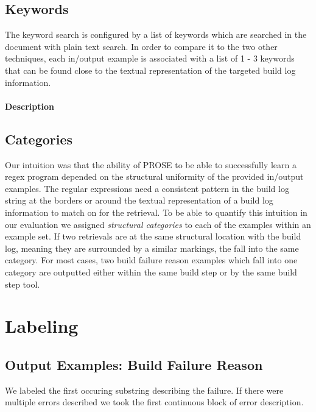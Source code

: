 \documentclass[\myrootdir/main.tex]{subfiles}
\begin{document}
\subsection{Keywords}
The keyword search is configured by a list of keywords which are searched in the document with plain text search. In order to compare it to the two other techniques, each in/output example is associated with a list of 1 - 3 keywords that can be found close to the textual representation of the targeted build log information.

\paragraph{Description}


\subsection{Categories}
Our intuition was that the ability of PROSE to be able to successfully learn a regex program depended on the structural uniformity of the provided in/output examples.
The regular expressions need a consistent pattern in the build log string at the borders or around the textual representation of a build log information to match on for the retrieval.
To be able to quantify this intuition in our evaluation we assigned \emph{structural categories} to each of the examples within an example set.
If two retrievals are at the same structural location with the build log, meaning they are surrounded by a similar markings, the fall into the same category.
For most cases, two build failure reason examples which fall into one category are outputted either within the same build step or by the same build step tool.

\section{Labeling}
\subsection{Output Examples: Build Failure Reason}
We labeled the first occuring substring describing the failure. If there were multiple errors described we took the first continuous block of error description.
\end{document}
